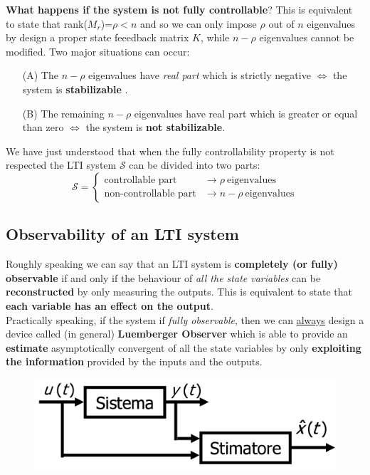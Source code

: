 \vspace{0.2cm} \noindent
\textbf{What happens if the system is not fully controllable}? This is equivalent to state that rank($M_r$)=$\rho<n$ and so we can only impose $\rho$ out of $n$ eigenvalues by design a proper state feeedback matrix $K$, while $n-\rho$ eigenvalues cannot be modified. Two major situations can occur:
\begin{itemize}
    \item[(A)] The $n-\rho$ eigenvalues have \textit{real part} which is strictly negative $\iff$ the system is {\color{red}\textbf{stabilizable}  }.
    \item[(B)] The remaining $n-\rho$ eigenvalues have real part which is greater or equal than zero $\iff$ the system is \textbf{not stabilizable}.
\end{itemize}

\noindent
We have just understood that when the fully controllability property is not respected the LTI system $\mathcal{S}$ can be divided into two parts:
{\large{
    \begin{equation*}
        \mathcal{S}=\begin{cases}
            \text{controllable part }&\to {\rho \ \text{eigenvalues}}\\
            \text{non-controllable part}&\to {n-\rho \ \text{eigenvalues}}
        \end{cases}
    \end{equation*}
}}

\subsection{Observability of an LTI system}
Roughly speaking we can say that an LTI system is \textbf{completely (or fully) observable} if and only if the behaviour  of \textit{all the state variables} can be \textbf{reconstructed} by only measuring the outputs. This is equivalent to state that \textbf{each variable has an effect on the output}.\\
Practically speaking, if the system if \textit{fully observable}, then we can \underline{always} design a device called (in general) \textbf{Luemberger Observer} which is able to provide an \textbf{estimate} asymptotically convergent of all the state variables by only \textbf{exploiting the information} provided by the inputs and the outputs.  

\begin{figure}[h]
    \centering
    \includegraphics[scale=0.8]{images/observer.png}
\end{figure}

